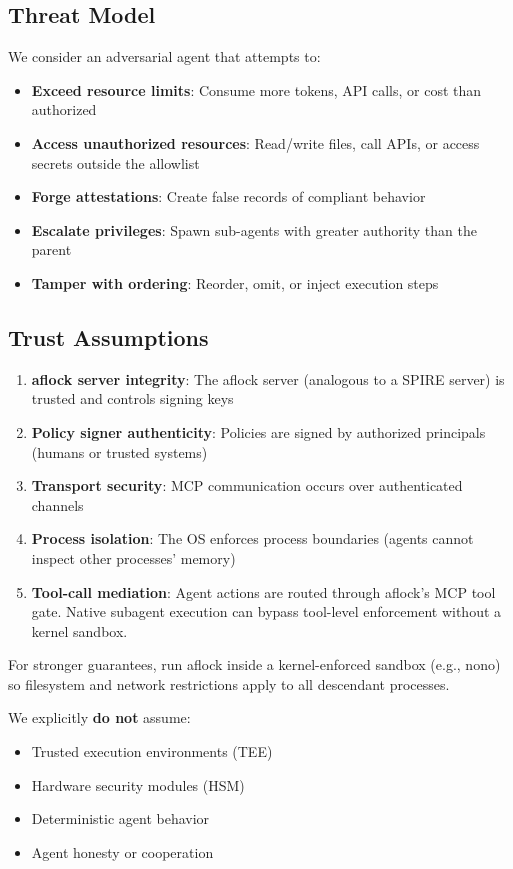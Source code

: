 \documentclass[11pt,a4paper]{article}
\begin{document}
\subsection{Threat Model}

We consider an adversarial agent that attempts to:
\begin{itemize}[noitemsep]
    \item \textbf{Exceed resource limits}: Consume more tokens, API calls, or cost than authorized
    \item \textbf{Access unauthorized resources}: Read/write files, call APIs, or access secrets outside the allowlist
    \item \textbf{Forge attestations}: Create false records of compliant behavior
    \item \textbf{Escalate privileges}: Spawn sub-agents with greater authority than the parent
    \item \textbf{Tamper with ordering}: Reorder, omit, or inject execution steps
\end{itemize}

\subsection{Trust Assumptions}

\begin{enumerate}
    \item \textbf{aflock server integrity}: The aflock server (analogous to a SPIRE server) is trusted and controls signing keys
    \item \textbf{Policy signer authenticity}: Policies are signed by authorized principals (humans or trusted systems)
    \item \textbf{Transport security}: MCP communication occurs over authenticated channels
    \item \textbf{Process isolation}: The OS enforces process boundaries (agents cannot inspect other processes' memory)
    \item \textbf{Tool-call mediation}: Agent actions are routed through aflock's MCP tool gate. Native subagent execution can bypass tool-level enforcement without a kernel sandbox.
\end{enumerate}

For stronger guarantees, run aflock inside a kernel-enforced sandbox (e.g., nono) so filesystem and network restrictions apply to all descendant processes.

We explicitly \textbf{do not} assume:
\begin{itemize}[noitemsep]
    \item Trusted execution environments (TEE)
    \item Hardware security modules (HSM)
    \item Deterministic agent behavior
    \item Agent honesty or cooperation
\end{itemize}
\end{document}
